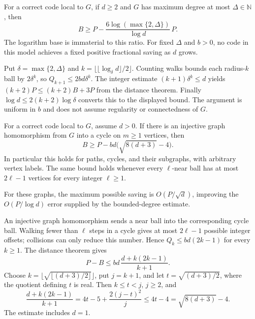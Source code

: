 \begin{corollary}\label{cor:local-xor-degree}
For a correct code local to $G$, if $d\ge2$ and $G$ has maximum degree at
most $\Delta\in\mathbb N$, then
\[
 B\ge P-\frac{6\log(\max\{2,\Delta\})}{\log d}\,P.
\]
The logarithm base is immaterial to this ratio.  For fixed $\Delta$ and
$b>0$, no code in this model achieves a fixed positive fractional saving as
$d$ grows.
\end{corollary}
\begin{proofoutline}
Put $\delta=\max\{2,\Delta\}$ and
$k=\lfloor\lfloor\log_\delta d\rfloor/2\rfloor$.  Counting walks bounds each
radius-$k$ ball by $2\delta^k$, so $Q_{k+1}\le2bd\delta^k$.
The integer estimate $(k+1)\delta^k\le d$ yields
$(k+2)P\le(k+2)B+3P$ from the distance theorem.
Finally $\log d\le2(k+2)\log\delta$ converts this to the displayed bound.
The argument is uniform in $b$ and does not assume regularity or
connectedness of $G$.
\end{proofoutline}

\begin{corollary}\label{cor:local-xor-cycle}
For a correct code local to $G$, assume $d>0$.  If there is an injective graph
homomorphism from $G$ into a cycle on $m\ge1$ vertices, then
\begin{equation}\label{eq:local-xor-cycle}
  B\ge P-bd\bigl(\sqrt{8(d+3)}-4\bigr).
\end{equation}
In particular this holds for paths, cycles, and their subgraphs, with arbitrary
vertex labels.  The same bound holds whenever every $\ell$-near ball has at
most $2\ell-1$ vertices for every integer $\ell\ge1$.
\end{corollary}
For these graphs, the maximum possible saving is $O(P/\sqrt d)$, improving
the $O(P/\log d)$ error supplied by the bounded-degree estimate.
\begin{proofoutline}
An injective graph homomorphism sends a near ball into the corresponding
cycle ball.  Walking fewer than $\ell$ steps in a cycle gives at most
$2\ell-1$ possible integer offsets; collisions can only reduce this number.
Hence $Q_k\le bd(2k-1)$ for every $k\ge1$.  The distance theorem gives
\[
  P-B\le bd\,\frac{d+k(2k-1)}{k+1}.
\]
Choose $k=\lfloor\sqrt{\lfloor(d+3)/2\rfloor}\rfloor$, put $j=k+1$, and
let $t=\sqrt{(d+3)/2}$, where the quotient defining $t$ is real.
Then $k\le t<j$, $j\ge2$, and
\[
 \frac{d+k(2k-1)}{k+1}
    =4t-5+\frac{2(j-t)^2}{j}\le4t-4
    =\sqrt{8(d+3)}-4.
\]
The estimate includes $d=1$.
\end{proofoutline}

